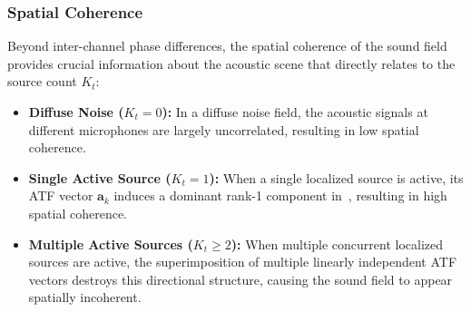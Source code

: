\documentclass[lettersize,journal]{IEEEtran}
\begin{document}
\subsubsection{Spatial Coherence}
\label{sec:feat_coherence}
\label{sec:feat_gmsc}
Beyond inter-channel phase differences, the spatial coherence of the sound field provides crucial information about the acoustic scene that directly relates to the source count $K_t$:
\begin{itemize}
  \item \textbf{Diffuse Noise ($K_t = 0$):} In a diffuse noise field, the acoustic signals at different microphones are largely uncorrelated, resulting in low spatial coherence.
  \item \textbf{Single Active Source ($K_t = 1$):} When a single localized source is active, its \gls{ATF} vector $\mathbf{a}_k$ induces a dominant rank-1 component in~, resulting in high spatial coherence.
  \item \textbf{Multiple Active Sources ($K_t \ge 2$):} When multiple concurrent localized sources are active, the superimposition of multiple linearly independent \gls{ATF} vectors destroys this directional structure, causing the sound field to appear spatially incoherent.
\end{itemize}
\end{document}
